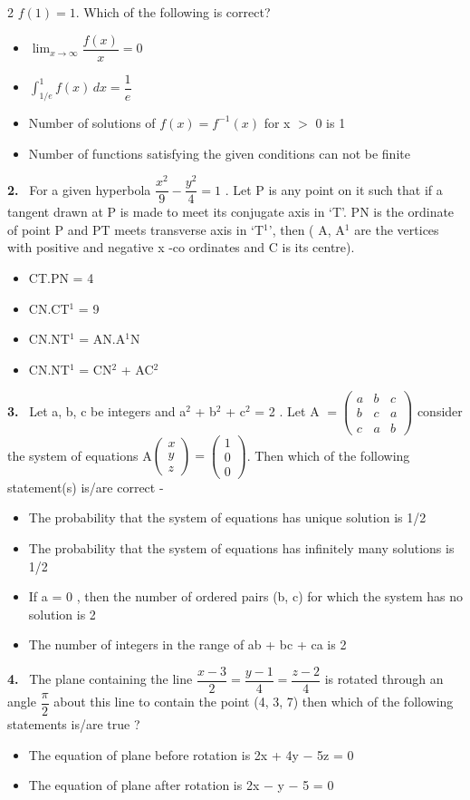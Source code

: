 \documentclass[10pt]{extarticle}
\newcommand{\qn}[1]{\par\smallskip\noindent\textbf{#1.}~}
\newenvironment{qoptions}{\begin{itemize}[leftmargin=1.8em,itemsep=1pt,topsep=2pt,label={}]}{\end{itemize}}
\newcommand{\opt}[2]{\item[(#1)] #2}
\begin{document}
\begin{multicols}{2}
$f(1)=1$. Which of the following is correct?
\begin{qoptions}
\opt{A}{$\displaystyle\lim_{x\to\infty}\dfrac{f(x)}x=0$}
\opt{B}{$\displaystyle\int_{1/e}^{1}f(x)\,dx=\dfrac1e$}
\opt{C}{Number of solutions of $f(x)=f^{-1}(x)$ for x $>$ 0 is 1}
\opt{D}{Number of functions satisfying the given conditions can not be finite}
\end{qoptions}
\qn{2} For a given hyperbola $\dfrac{x^2}9-\dfrac{y^2}4=1$ . Let P is any point on it such that if a tangent drawn at P is made to meet its conjugate axis in `T'. PN is the ordinate of point P and PT meets transverse axis in `T$^1$', then ( A, A$^1$ are the vertices with positive and negative x -co ordinates and C is its centre).
\begin{qoptions}
\opt{A}{CT.PN = 4}
\opt{B}{CN.CT$^1$ = 9}
\opt{C}{CN.NT$^1$ = AN.A$^1$N}
\opt{D}{CN.NT$^1$ = CN$^2$ + AC$^2$}
\end{qoptions}
\qn{3} Let a, b, c be integers and a$^2$ + b$^2$ + c$^2$ = 2 . Let A $=\begin{pmatrix}a&b&c\\b&c&a\\c&a&b\end{pmatrix}$ consider the system of equations A$\begin{pmatrix}x\\y\\z\end{pmatrix}=\begin{pmatrix}1\\0\\0\end{pmatrix}$. Then which of the following statement(s) is/are correct -
\begin{qoptions}
\opt{A}{The probability that the system of equations has unique solution is 1/2}
\opt{B}{The probability that the system of equations has infinitely many solutions is 1/2}
\opt{C}{If a = 0 , then the number of ordered pairs (b, c) for which the system has no solution is 2}
\opt{D}{The number of integers in the range of ab + bc + ca is 2}
\end{qoptions}
\qn{4} The plane containing the line $\dfrac{x-3}2=\dfrac{y-1}4=\dfrac{z-2}4$ is rotated through an angle $\dfrac\pi2$ about this line to contain the point (4, 3, 7) then which of the following statements is/are true ?
\begin{qoptions}
\opt{A}{The equation of plane before rotation is 2x + 4y $-$ 5z = 0}
\opt{B}{The equation of plane after rotation is 2x $-$ y $-$ 5 = 0}

\end{qoptions}
\end{multicols}
\end{document}
